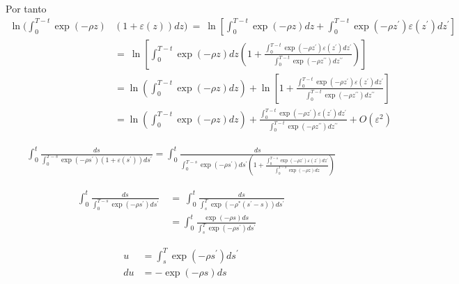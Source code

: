 Por tanto
\begin{equation*}
    \begin{split}
        \ln \biggl(\int_{0}^{T-t}\exp(-\rho z) & (1+\varepsilon(z))d z\biggl)\ =\ \ln\left[\int_{0}^{T-t}\exp(-\rho z)dz + \int_{0}^{T-t}\exp(-\rho z^{\prime})\varepsilon(z^{\prime})dz^{\prime}\right] \\
        &=\ \ln\left[\int_{0}^{T-t}\exp(-\rho z)d z\left(1+\frac{\int_{0}^{T-t}\exp(-\rho z^{\prime})\varepsilon(z^{\prime})d z^{\prime}}{\int_{0}^{T-t}\exp(-\rho z^{\prime\prime})d z^{\prime\prime}}\right)\right] \\
        &= \ln\left(\int_{0}^{T-t}\exp(-\rho z)d z\right)+\ln\left[1+{\frac{\int_{0}^{T-t}\exp(-\rho z^{\prime})\varepsilon(z^{\prime})d z^{\prime}}{\int_{0}^{T-t}\exp(-\rho z^{\prime\prime})d z^{\prime\prime}}}\right] \\
        &= \ln\left(\int_{0}^{T-t}\exp(-\rho z)d z\right)+\frac{\int_{0}^{T-t}\exp(-\rho z^{\prime})\varepsilon(z^{\prime})d z^{\prime}}{\int_{0}^{T-t}\exp(-\rho z^{\prime\prime})d z^{\prime\prime}}+O(\varepsilon^{2})
    \end{split}
\end{equation*}

\begin{equation*}
    \begin{split}
        \int_{0}^{t}{\frac{d s}{\int_{0}^{T-s}\exp(-\rho s^{\prime})(1+\varepsilon(s^{\prime}))d s^{\prime}}}=\int_{0}^{t}\frac{d s}{\int_{0}^{T-s}\exp(-\rho s^{\prime})d s^{\prime}\left(1+\frac{\int_{0}^{T-s}\exp(-\rho z^{\prime})\varepsilon(z^{\prime})d z^{\prime}}{\int_{0}^{T-s}\exp(-\rho z)d z}\right)}
    \end{split}
\end{equation*}

\begin{equation*}
    \begin{split}
        \int_{0}^{t}\frac{d s}{\int_{0}^{T-s}\exp(-\rho s^{\prime})d s^{\prime}}~&=~\int_{0}^{t}\frac{d s}{\int_{s}^{T}\exp(-\rho^{*}(s^{\prime}-s))d s^{\prime}} \\
        &= \int_{0}^{t}{\frac{\exp(-\rho s)d s}{\int_{s}^{T}\exp(-\rho s^{\prime})d s^{\prime}}}
    \end{split}
\end{equation*}

\begin{equation*}
    \begin{split}
     u&=\int_{s}^{T}\exp(-\rho s^{\prime})d s^{\prime} \\
     du &= - \exp(- \rho s) ds
    \end{split}
\end{equation*}

